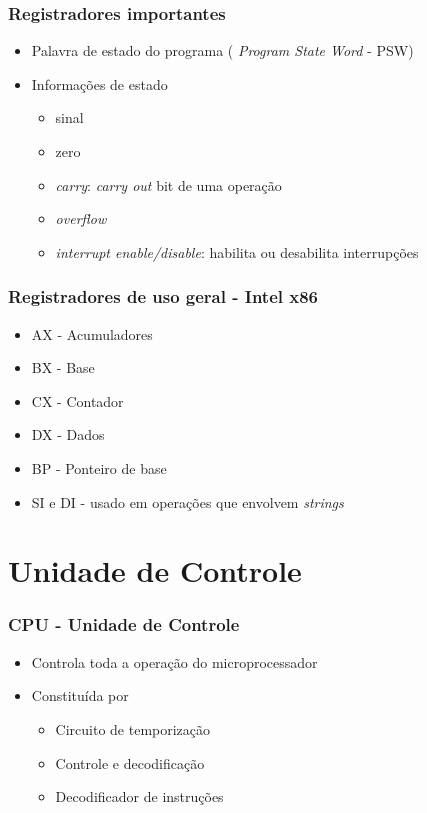 \documentclass[aspectratio=169,
				xcolor=table]{beamer}
\begin{document}
		\begin{frame}
			\frametitle{Registradores importantes}
			\begin{itemize}
				\item Palavra de estado do programa ( \textit{Program State Word} - PSW)
				\vspace{1em}
				\item Informações de estado 
				\begin{itemize}
					\item sinal
					\item zero
					\item \textit{carry}: \textit{carry out} bit de uma operação
					\item \textit{overflow}
					\item  \textit{interrupt enable/disable}: habilita ou desabilita interrupções
				\end{itemize}
			\end{itemize}
		\end{frame}
		
		\begin{frame}
			\frametitle{Registradores de uso geral - Intel x86}
			\begin{itemize}
				\item AX - Acumuladores
				\item BX - Base
				\item CX - Contador
				\item DX - Dados
				\item BP - Ponteiro de base
				\item SI e DI - usado em operações que envolvem \textit{strings}
			\end{itemize}
			
		\end{frame}

	\section{Unidade de Controle}		
		\begin{frame}
			\frametitle{CPU - Unidade de Controle}
			\begin{itemize}
				\item Controla toda a operação do microprocessador
				\vspace{1em}
				\item Constituída por
				\begin{itemize}
					\item Circuito de temporização
					\item Controle e decodificação
					\item Decodificador de instruções
				\end{itemize}
			\end{itemize}
		\end{frame}
\end{document}
